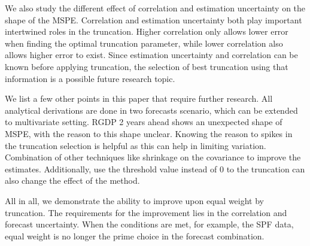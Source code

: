 \documentclass[11pt]{article}
\begin{document}
We also study the different effect of correlation and estimation uncertainty on the shape of the MSPE. Correlation and estimation uncertainty both play important intertwined roles in the truncation. Higher correlation only allows lower error when finding the optimal truncation parameter, while lower correlation also allows higher error to exist. Since estimation uncertainty and correlation can be known before applying truncation, the selection of best truncation using that information is a possible future research topic.

We list a few other points in this paper that require further research. All analytical derivations are done in two forecasts scenario, which can be extended to multivariate setting. 
RGDP 2 years ahead shows an unexpected shape of MSPE, with the reason to this shape unclear.
Knowing the reason to spikes in the truncation selection is helpful as this can help in limiting variation.
Combination of other techniques like shrinkage on the covariance to improve the estimates. Additionally, use the threshold value instead of 0 to the truncation can also change the effect of the method.

All in all, we demonstrate the ability to improve upon equal weight by truncation. The requirements for the improvement lies in the correlation and forecast uncertainty. When the conditions are met, for example, the SPF data, equal weight is no longer the prime choice in the forecast combination. 




\end{document}
